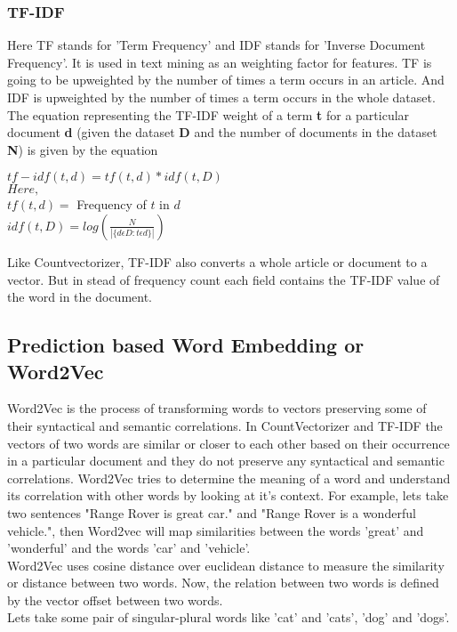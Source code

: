 \documentclass[12pt]{article}
\begin{document}
\subsubsection{TF-IDF}
Here TF stands for 'Term Frequency' and IDF stands for 'Inverse Document Frequency'. It is used in text mining as an weighting factor for features. TF is going to be upweighted by the number of times a term occurs in an article. And IDF is upweighted by the number of times a term occurs in the whole dataset. The equation representing the TF-IDF weight of a term \textbf{t} for a particular document \textbf{d} (given the dataset \textbf{D} and the number of documents in the dataset \textbf{N}) is given by the equation

\begin{center}
$tf-idf(t,d) = tf(t,d) * idf(t,D)$\\
$Here,$\\ 
$tf(t,d) = $ Frequency of \textbf{$t$} in \textbf{$d$}\\
$idf(t,D) = log(\frac{N}{\left| \{d \epsilon D : t \epsilon d\} \right|})$
\end{center}

Like Countvectorizer, TF-IDF also converts a whole article or document to a vector. But in stead of frequency count each field contains the TF-IDF value of the word in the document.

\subsection{Prediction based Word Embedding or Word2Vec}
Word2Vec is the process of transforming words to vectors preserving some of their syntactical and semantic correlations. In CountVectorizer and TF-IDF the vectors of two words are similar or closer to each other based on their occurrence in a particular document and they do not preserve any syntactical and semantic correlations. Word2Vec tries to determine the meaning of a word and understand its correlation with other words by looking at it's context. For example, lets take two sentences "Range Rover is great car." and "Range Rover is a wonderful vehicle.", then Word2vec will map similarities between the words 'great' and 'wonderful' and the words 'car' and 'vehicle'.\\
Word2Vec uses cosine distance over euclidean distance to measure the similarity or distance between two words. Now, the relation between two words is defined by the vector offset between two words.\\
Lets take some pair of singular-plural words like 'cat' and 'cats', 'dog' and 'dogs'.
\end{document}
